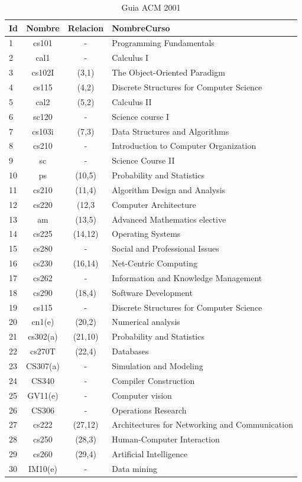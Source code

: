 \begin{table}[H]
\centering
\caption{Guia ACM 2001}
\begin{tabular}[t]{lccl}
\hline
Id&Nombre&Relacion&NombreCurso\\
\hline
1&cs101		&-		&Programming Fundamentals\\
2&cal1		&-		&Calculus I\\
3&cs102I	&(3,1)	&The Object-Oriented Paradigm\\
4&cs115		&(4,2)	&Discrete Structures for Computer Science\\
5&cal2		&(5,2)	&Calculus II\\
6&sc120		&-		&Science course I\\
7&cs103i	&(7,3)	&Data Structures and Algorithms\\
8&cs210		&-		&Introduction to Computer Organization\\
9&sc		&-		&Science Course II\\
10&ps		&(10,5)	&Probability and Statistics\\
11&cs210	&(11,4)	&Algorithm Design and Analysis\\
12&cs220	&(12,3	&Computer Architecture\\
13&am		&(13,5)	&Advanced Mathematics elective\\
14&cs225	&(14,12)&Operating Systems\\
15&cs280	&-		&Social and Professional Issues\\
16&cs230	&(16,14)&Net-Centric Computing\\
17&cs262	&-		&Information and Knowledge Management\\
18&cs290	&(18,4)	&Software Development\\
19&cs115	&-		&Discrete Structures for Computer Science\\
20&cn1(e)	&(20,2)	&Numerical analysis\\
21&cs302(a)	&(21,10)&Probability and Statistics\\
22&cs270T	&(22,4)	&Databases\\
23&CS307(a)	&-		&Simulation and Modeling\\
24&CS340	&-		&Compiler Construction\\
25&GV11(e)	&-		&Computer vision\\
26&CS306	&-		&Operations Research\\
27&cs222	&(27,12)&Architectures for Networking and Communication\\
28&cs250	&(28,3)	&Human-Computer Interaction\\
29&cs260	&(29,4)	&Artificial Intelligence\\
30&IM10(e)	&-		&Data mining\\
\hline
\end{tabular}
\label{tab:tabsacm2001}
\end{table}

